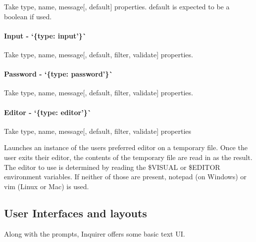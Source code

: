 Take {\ttfamily type}, {\ttfamily name}, {\ttfamily message}\mbox{[}, {\ttfamily default}\mbox{]} properties. {\ttfamily default} is expected to be a boolean if used.

 



\paragraph*{Input -\/ `\{type\+: \textquotesingle{}input'\}\`{}}

Take {\ttfamily type}, {\ttfamily name}, {\ttfamily message}\mbox{[}, {\ttfamily default}, {\ttfamily filter}, {\ttfamily validate}\mbox{]} properties.

 



\paragraph*{Password -\/ `\{type\+: \textquotesingle{}password'\}\`{}}

Take {\ttfamily type}, {\ttfamily name}, {\ttfamily message}\mbox{[}, {\ttfamily default}, {\ttfamily filter}, {\ttfamily validate}\mbox{]} properties.

 



\paragraph*{Editor -\/ `\{type\+: \textquotesingle{}editor'\}\`{}}

Take {\ttfamily type}, {\ttfamily name}, {\ttfamily message}\mbox{[}, {\ttfamily default}, {\ttfamily filter}, {\ttfamily validate}\mbox{]} properties

Launches an instance of the users preferred editor on a temporary file. Once the user exits their editor, the contents of the temporary file are read in as the result. The editor to use is determined by reading the \$\+V\+I\+S\+U\+AL or \$\+E\+D\+I\+T\+OR environment variables. If neither of those are present, notepad (on Windows) or vim (Linux or Mac) is used.

\label{_layouts}%
 \subsection*{User Interfaces and layouts}

Along with the prompts, Inquirer offers some basic text UI.

